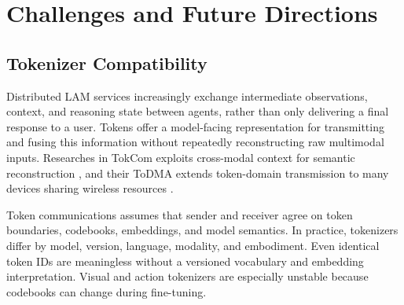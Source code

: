 \documentclass[letterpaper,journal]{IEEEtran}
\begin{document}
\section{Challenges and Future Directions}
\label{sec:future}



\subsection{Tokenizer Compatibility}
Distributed LAM services increasingly exchange intermediate observations,
context, and reasoning state between agents, rather than only delivering a
final response to a user. Tokens offer a model-facing representation for
transmitting and fusing this information without repeatedly reconstructing
raw multimodal inputs. Researches in TokCom exploits cross-modal context for
semantic reconstruction \cite{tokcom}, and their ToDMA extends token-domain
transmission to many devices sharing wireless resources \cite{todma}. 

Token communications assumes that sender and receiver agree on token
boundaries, codebooks, embeddings, and model semantics. In practice,
tokenizers differ by model, version, language, modality, and embodiment.
Even identical token IDs are meaningless without a versioned vocabulary and
embedding interpretation. Visual and action tokenizers are especially
unstable because codebooks can change during fine-tuning.
\end{document}
